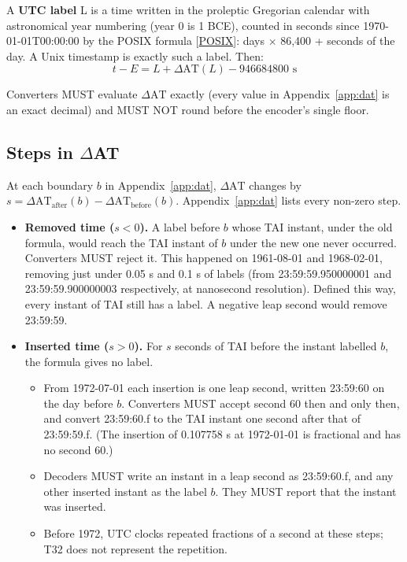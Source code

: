 \documentclass[11pt]{article}
\newcommand{\dAT}{\ensuremath{\Delta\mathrm{AT}}}
\newcommand{\App}[1]{Appendix~\ref{#1}}
\newcommand{\xref}[1]{[\hyperref[ref:#1]{#1}]}
\begin{document}
A \textbf{UTC label} L is a time written in the proleptic Gregorian calendar
with astronomical year numbering (year 0 is 1 BCE), counted in seconds since
1970-01-01T00:00:00 by the POSIX formula \xref{POSIX}: days $\times$ 86,400 +
seconds of the day. A Unix timestamp is exactly such a label. Then:
\[
t - E = L + \Delta\mathrm{AT}(L) - 946684800 \text{ s}
\]

Converters MUST evaluate \dAT{} exactly (every value in \App{app:dat} is an
exact decimal) and MUST NOT round before the encoder's single floor.

\subsection{Steps in \texorpdfstring{$\Delta$AT}{Delta AT}}\label{sec:steps}

At each boundary $b$ in \App{app:dat}, \dAT{} changes by
$s = \Delta\mathrm{AT}_\text{after}(b) - \Delta\mathrm{AT}_\text{before}(b)$.
\App{app:dat} lists every non-zero step.

\begin{itemize}
\item \textbf{Removed time ($s < 0$).} A label before $b$ whose TAI instant,
under the old formula, would reach the TAI instant of $b$ under the new one
never occurred. Converters MUST reject it. This happened on 1961-08-01 and
1968-02-01, removing just under 0.05 s and 0.1 s of labels (from
23:59:59.950000001 and 23:59:59.900000003 respectively, at nanosecond
resolution). Defined this way, every instant of TAI still has a label. A
negative leap second would remove 23:59:59.
\item \textbf{Inserted time ($s > 0$).} For $s$ seconds of TAI before the
instant labelled $b$, the formula gives no label.
\begin{itemize}
\item From 1972-07-01 each insertion is one leap second, written 23:59:60 on
the day before $b$. Converters MUST accept second 60 then and only then, and
convert 23:59:60.f to the TAI instant one second after that of 23:59:59.f.
(The insertion of 0.107758 s at 1972-01-01 is fractional and has no second
60.)
\item Decoders MUST write an instant in a leap second as 23:59:60.f, and any
other inserted instant as the label $b$. They MUST report that the instant was
inserted.
\item Before 1972, UTC clocks repeated fractions of a second at these steps;
T32 does not represent the repetition.
\end{itemize}
\end{itemize}
\end{document}
